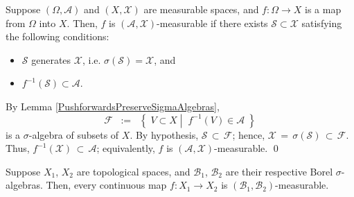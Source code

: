 \begin{theorem}
\label{preimageOfGeneratingSetMeasurable}
\mbox{}\vskip 0.1cm
\noindent
Suppose $(\Omega,\mathcal{A})$ and $(X,\mathcal{X})$
are measurable spaces, and $f : \Omega \longrightarrow X$
is a map from $\Omega$ into $X$. Then,
$f$ is $(\mathcal{A},\mathcal{X})$-measurable
if there exists $\mathcal{S} \subset \mathcal{X}$
satisfying the following conditions:
\begin{itemize}
\item	$\mathcal{S}$ generates $\mathcal{X}$, i.e. $\sigma(\mathcal{S}) = \mathcal{X}$, and
\item	$f^{-1}\!\left(\mathcal{S}\right) \subset \mathcal{A}$.
\end{itemize}
\end{theorem}
\proof
By Lemma \ref{PushforwardsPreserveSigmaAlgebras},
\begin{equation*}
\mathcal{F}
\;\; := \;\;
\left\{\;
V \subset X
\;\left\vert\;\;
f^{-1}\left(V\right) \in \mathcal{A}
\right.
\;\right\}
\end{equation*}
is a $\sigma$-algebra of subsets of $X$.
By hypothesis, $\mathcal{S} \,\subset\, \mathcal{F}$;
hence, $\mathcal{X} \,=\, \sigma(\mathcal{S}) \,\subset\, \mathcal{F}$.
Thus, $f^{-1}(\mathcal{X}) \,\subset\, \mathcal{A}$;
equivalently, $f$ is $\left(\mathcal{A},\mathcal{X}\right)$-measurable.
\qed

\begin{corollary}
\label{ContinuousMapsAreBorelMeasurable}
\mbox{}\vskip 0.1cm
\noindent
Suppose $X_{1}$, $X_{2}$ are topological spaces, and
$\mathcal{B}_{1}$, $\mathcal{B}_{2}$ are their respective Borel $\sigma$-algebras.
Then, every continuous map $f : X_{1} \longrightarrow X_{2}$ is
$\left(\mathcal{B}_{1},\mathcal{B}_{2}\right)$-measurable.
\end{corollary}

